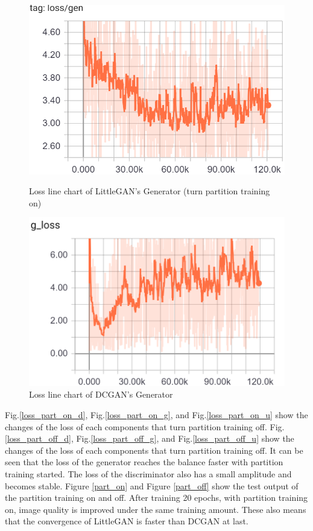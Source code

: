     \begin{figure}
        \begin{minipage}[t]{0.49\linewidth}
            \centering
            \includegraphics[width=\textwidth]{figures/loss_part_on_g.png}
            \caption{Loss line chart of LittleGAN's Generator (turn partition training on)}
            \label{loss_part_on_g}
        \end{minipage}
            \hfill
        \begin{minipage}[t]{0.49\linewidth}
            \centering
            \includegraphics[width=\textwidth]{figures/loss_dcgan_g.png}
            \caption{Loss line chart of DCGAN's Generator}
            \label{loss_dcgan_g}
        \end{minipage}
    \end{figure}

Fig.\ref{loss_part_on_d}, Fig.\ref{loss_part_on_g}, and Fig.\ref{loss_part_on_u} show the changes of the loss of each components that turn partition training off.
Fig.\ref{loss_part_off_d}, Fig.\ref{loss_part_off_g}, and Fig.\ref{loss_part_off_u} show the changes of the loss of each components that turn partition training off.
It can be seen that the loss of the generator reaches the balance faster with partition training started.
 The loss of the discriminator also has a small amplitude and becomes stable.
Figure \ref{part_on} and Figure \ref{part_off} show the test output of the partition training on and off.
After training 20 epochs, with partition training on, image quality is improved under the same training amount.
These also means that the convergence of LittleGAN is faster than DCGAN at last.

